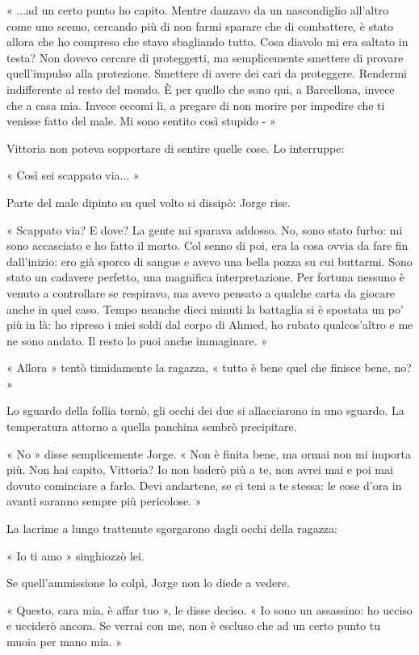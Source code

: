 « ...ad un certo punto ho capito. Mentre danzavo da un nascondiglio all'altro come uno scemo, cercando più di non farmi sparare che di combattere, è stato allora che ho compreso che stavo sbagliando tutto. Cosa diavolo mi era saltato in testa? Non dovevo cercare di proteggerti, ma semplicemente smettere di provare quell'impulso alla protezione. Smettere di avere dei cari da proteggere. Rendermi indifferente al resto del mondo. È per quello che sono qui, a Barcellona, invece che a casa mia. Invece eccomi lì, a pregare di non morire per impedire che ti venisse fatto del male. Mi sono sentito così stupido - »

Vittoria non poteva sopportare di sentire quelle cose. Lo interruppe:

« Così sei scappato via... »

Parte del male dipinto su quel volto si dissipò: Jorge rise.

« Scappato via? E dove? La gente mi sparava addosso. No, sono stato furbo: mi sono accasciato e ho fatto il morto. Col senno di poi, era la cosa ovvia da fare fin dall'inizio: ero già sporco di sangue e avevo una bella pozza su cui buttarmi. Sono stato un cadavere perfetto, una magnifica interpretazione. Per fortuna nessuno è venuto a controllare se respiravo, ma avevo pensato a qualche carta da giocare anche in quel caso. Tempo neanche dieci minuti la battaglia si è spostata un po' più in là: ho ripreso i miei soldi dal corpo di Ahmed, ho rubato qualcos'altro e me ne sono andato. Il resto lo puoi anche immaginare. »

« Allora » tentò timidamente la ragazza, « tutto è bene quel che finisce bene, no? »

Lo sguardo della follia tornò, gli occhi dei due si allacciarono in uno sguardo. La temperatura attorno a quella panchina sembrò precipitare.

« No » disse semplicemente Jorge. « Non è finita bene, ma ormai non mi importa più. Non hai capito, Vittoria? Io non baderò più a te, non avrei mai e poi mai dovuto cominciare a farlo. Devi andartene, se ci teni a te stessa: le cose d'ora in avanti saranno sempre più pericolose. »

La lacrime a lungo trattenute sgorgarono dagli occhi della ragazza:

« Io ti amo » singhiozzò lei.

Se quell'ammissione lo colpì, Jorge non lo diede a vedere.

« Questo, cara mia, è affar tuo », le disse deciso. « Io sono un assassino: ho ucciso e ucciderò ancora. Se verrai con me, non è escluso che ad un certo punto tu muoia per mano mia. »

